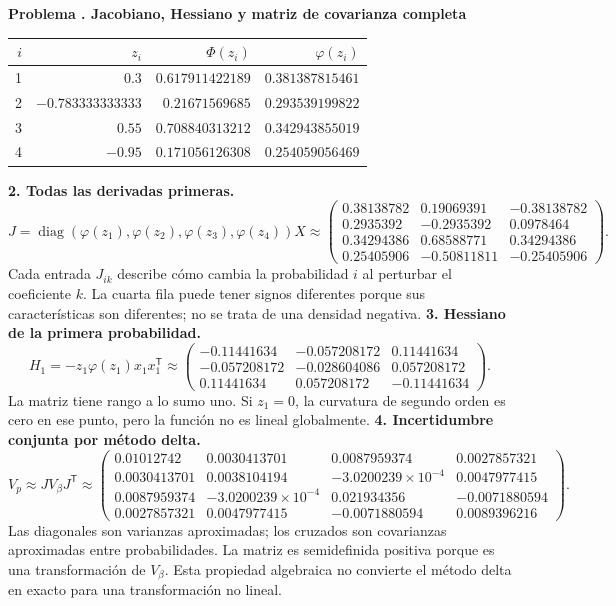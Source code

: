 \documentclass[11pt,a4paper]{article}
\newcommand{\T}{^{\mathsf T}}
\DeclareMathOperator{\diag}{diag}
\theoremstyle{definition}
\newcounter{problema}
\newenvironment{resuelto}[1]{\refstepcounter{problema}\par\medskip\Needspace{6\baselineskip}\textbf{Problema \theproblema. #1}\par}{\par\medskip}
\begin{document}
\begin{resuelto}{Jacobiano, Hessiano y matriz de covarianza completa}
\begin{center}\small\begin{tabular}{rrrr}
\toprule
$i$&$z_i$&$\Phi(z_i)$&$\varphi(z_i)$\\
\midrule
1&$0.3$&$0.617911422189$&$0.381387815461$\\
2&$-0.783333333333$&$0.21671569685$&$0.293539199822$\\
3&$0.55$&$0.708840313212$&$0.342943855019$\\
4&$-0.95$&$0.171056126308$&$0.254059056469$\\
\bottomrule\end{tabular}\end{center}
\textbf{2. Todas las derivadas primeras.}
\[
J=\diag(\varphi(z_1),\varphi(z_2),\varphi(z_3),\varphi(z_4))X\approx\begin{pmatrix}0.38138782&0.19069391&-0.38138782\\0.2935392&-0.2935392&0.0978464\\0.34294386&0.68588771&0.34294386\\0.25405906&-0.50811811&-0.25405906\end{pmatrix}.
\]
Cada entrada $J_{ik}$ describe cómo cambia la probabilidad $i$ al perturbar el coeficiente $k$. La cuarta fila puede tener signos diferentes porque sus características son diferentes; no se trata de una densidad negativa.
\textbf{3. Hessiano de la primera probabilidad.}
\[
H_1=-z_1\varphi(z_1)x_1x_1\T\approx\begin{pmatrix}-0.11441634&-0.057208172&0.11441634\\-0.057208172&-0.028604086&0.057208172\\0.11441634&0.057208172&-0.11441634\end{pmatrix}.
\]
La matriz tiene rango a lo sumo uno. Si $z_1=0$, la curvatura de segundo orden es cero en ese punto, pero la función no es lineal globalmente.
\textbf{4. Incertidumbre conjunta por método delta.}
\[
V_p\approx JV_\beta J\T\approx\begin{pmatrix}0.01012742&0.0030413701&0.0087959374&0.0027857321\\0.0030413701&0.0038104194&-3.0200239\times10^{-4}&0.0047977415\\0.0087959374&-3.0200239\times10^{-4}&0.021934356&-0.0071880594\\0.0027857321&0.0047977415&-0.0071880594&0.0089396216\end{pmatrix}.
\]
Las diagonales son varianzas aproximadas; los cruzados son covarianzas aproximadas entre probabilidades. La matriz es semidefinida positiva porque es una transformación de $V_\beta$. Esta propiedad algebraica no convierte el método delta en exacto para una transformación no lineal.

\end{resuelto}
\end{document}
